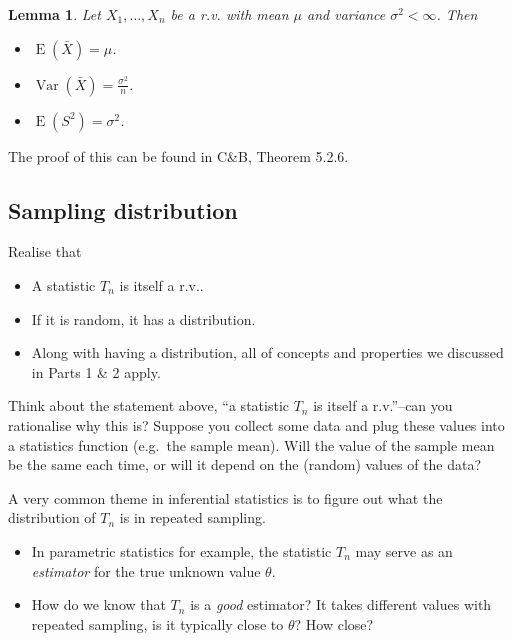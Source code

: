 \documentclass[
]{book}
\providecommand{\tightlist}{%
  \setlength{\itemsep}{0pt}\setlength{\parskip}{0pt}}
\DeclareMathOperator{\E}{E}
\DeclareMathOperator{\Var}{Var}
\newtheorem{lemma}{Lemma}[chapter]
\theoremstyle{definition}
\theoremstyle{definition}
\theoremstyle{definition}
\theoremstyle{definition}
\theoremstyle{remark}
\begin{document}
\begin{lemma}

Let \(X_1,\dots,X_n\) be a r.v. with mean \(\mu\) and variance \(\sigma^2<\infty\). Then

\begin{itemize}
\tightlist
\item
  \(\E(\bar X) = \mu\).
\item
  \(\Var(\bar X) = \frac{\sigma^2}{n}\).
\item
  \(\E(S^2)=\sigma^2\).
\end{itemize}

\end{lemma}

The proof of this can be found in C\&B, Theorem 5.2.6.

\hypertarget{sampling-distribution}{%
\subsection{Sampling distribution}\label{sampling-distribution}}

Realise that

\begin{itemize}
\tightlist
\item
  A statistic \(T_n\) is itself a r.v..
\item
  If it is random, it has a distribution.
\item
  Along with having a distribution, all of concepts and properties we discussed in Parts 1 \& 2 apply.
\end{itemize}

Think about the statement above, ``a statistic \(T_n\) is itself a r.v.''--can you rationalise why this is? Suppose you collect some data and plug these values into a statistics function (e.g.~the sample mean). Will the value of the sample mean be the same each time, or will it depend on the (random) values of the data?

A very common theme in inferential statistics is to figure out what the distribution of \(T_n\) is in repeated sampling.

\begin{itemize}
\tightlist
\item
  In parametric statistics for example, the statistic \(T_n\) may serve as an \emph{estimator} for the true unknown value \(\theta\).
\item
  How do we know that \(T_n\) is a \emph{good} estimator? It takes different values with repeated sampling, is it typically close to \(\theta\)? How close?
\end{itemize}
\end{document}
